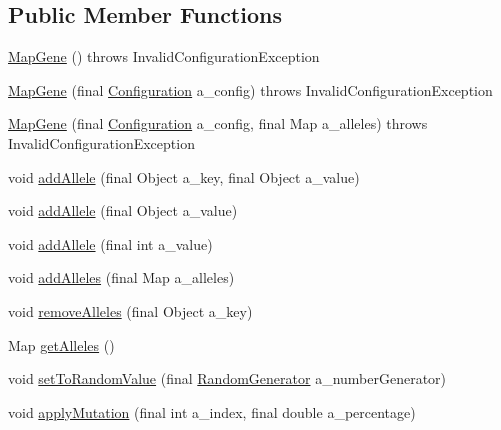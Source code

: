 \subsection*{Public Member Functions}
\begin{DoxyCompactItemize}
\item 
\hyperlink{classorg_1_1jgap_1_1impl_1_1_map_gene_a4c9c61edff0ee53c964347eb745e1a3e}{Map\-Gene} ()  throws Invalid\-Configuration\-Exception 
\item 
\hyperlink{classorg_1_1jgap_1_1impl_1_1_map_gene_a4ec0685191f0ca38e2ddc05e237b9577}{Map\-Gene} (final \hyperlink{classorg_1_1jgap_1_1_configuration}{Configuration} a\-\_\-config)  throws Invalid\-Configuration\-Exception 
\item 
\hyperlink{classorg_1_1jgap_1_1impl_1_1_map_gene_a66c96770b517a1582d6f771d4a35b134}{Map\-Gene} (final \hyperlink{classorg_1_1jgap_1_1_configuration}{Configuration} a\-\_\-config, final Map a\-\_\-alleles)  throws Invalid\-Configuration\-Exception 
\item 
void \hyperlink{classorg_1_1jgap_1_1impl_1_1_map_gene_a82dfbb6bc328e48d9ed1725baf75eb67}{add\-Allele} (final Object a\-\_\-key, final Object a\-\_\-value)
\item 
void \hyperlink{classorg_1_1jgap_1_1impl_1_1_map_gene_a04696095e30cf06edf25a4ea3d2c2546}{add\-Allele} (final Object a\-\_\-value)
\item 
void \hyperlink{classorg_1_1jgap_1_1impl_1_1_map_gene_a40f4ea96d222b87c688b400bef1fbb91}{add\-Allele} (final int a\-\_\-value)
\item 
void \hyperlink{classorg_1_1jgap_1_1impl_1_1_map_gene_acaf2b285f329ddf8a6d37f6fe9c01a3f}{add\-Alleles} (final Map a\-\_\-alleles)
\item 
void \hyperlink{classorg_1_1jgap_1_1impl_1_1_map_gene_aaa6f3a3a80baadf6a3216a1ef0167f24}{remove\-Alleles} (final Object a\-\_\-key)
\item 
Map \hyperlink{classorg_1_1jgap_1_1impl_1_1_map_gene_a05606dffa0ab3246b6a865a83680dd14}{get\-Alleles} ()
\item 
void \hyperlink{classorg_1_1jgap_1_1impl_1_1_map_gene_a537cd33d9eedd9ad384219ef0379bc62}{set\-To\-Random\-Value} (final \hyperlink{interfaceorg_1_1jgap_1_1_random_generator}{Random\-Generator} a\-\_\-number\-Generator)
\item 
void \hyperlink{classorg_1_1jgap_1_1impl_1_1_map_gene_ac9095e249f597d47c9c54aa9108afb77}{apply\-Mutation} (final int a\-\_\-index, final double a\-\_\-percentage)
\item 

\end{DoxyCompactItemize}
